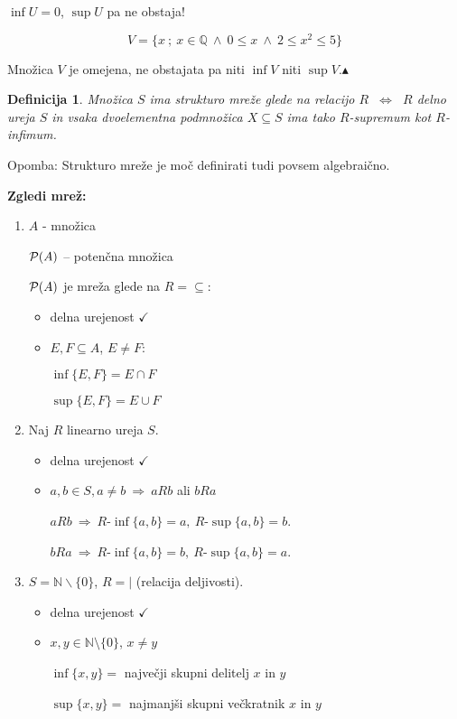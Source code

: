 \documentclass[11pt,paper=b5,footinclude,headinclude]{scrbook} %
\def\inn {{~\wedge~}}
\def\sledi {{~\Rightarrow~}}
\def\cee {{~\Leftrightarrow~}}
\def\kz{{\hfill{\color{blue}$\blacktriangle$}}}%
\newtheorem*{definicija}{Definicija}
\begin{document}
$\inf U = 0$, $\sup U$ pa ne obstaja!

\medskip
$$V = \{x~;~x\in \mathbb{Q}\inn 0\le x \inn 2\le x^2\le 5\}$$

Množica $V$ je omejena, ne obstajata pa niti $\inf V$ niti $\sup V$.\kz

\begin{definicija}
Množica $S$ ima strukturo {\em mreže} glede na relacijo $R$ $\cee$
$R$ delno ureja $S$ in vsaka {\em dvoelementna} podmnožica $X\subseteq S$
ima tako $R$-supremum kot $R$-infimum.
\end{definicija}

\bigskip

Opomba: Strukturo mreže je moč definirati tudi povsem algebraično.

\bigskip

\textbf{ Zgledi mrež:}
\begin{enumerate}
  \item $A$ - množica

  ${\cal P}(A)$ -- potenčna množica

  ${\cal P}(A)$ je mreža glede na $R = \subseteq$:
  \begin{itemize}
    \item delna urejenost $\checkmark$
     \item $E,F\subseteq A$, $E\neq F$:

     $\inf\{E,F\} = E\cap F$

     $\sup\{E,F\} = E\cup F$
  \end{itemize}
  \item Naj $R$ linearno ureja $S$.
\begin{itemize}
    \item delna urejenost $\checkmark$

    \item
   $a, b\in S, a\neq b\sledi aRb$ ali $bRa$

$aRb\sledi R\textrm{-}\inf\{a,b\} = a,~R\textrm{-}\sup\{a,b\} = b$.

$bRa\sledi R\textrm{-}\inf\{a,b\} = b,~R\textrm{-}\sup\{a,b\} = a$.
\end{itemize}

  \item $S = \mathbb{N}\backslash \{0\}$, $R = |$ (relacija deljivosti).
  \begin{itemize}
    \item delna urejenost $\checkmark$
    \item $x,y\in \mathbb{N}\setminus\{0\}$, $x\neq y$

    $\inf\{x,y\} = $ največji skupni delitelj $x$ in $y$

    $\sup\{x,y\} = $ najmanjši skupni večkratnik $x$ in $y$
  \end{itemize}
\end{enumerate}
\end{document}
